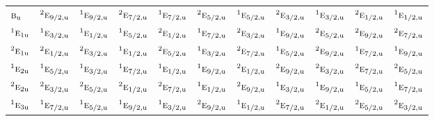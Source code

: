 \documentclass[10pt,a4paper]{article}
\numberwithin{equation}{section}
\newcommand{\irr}[1]{\text{\normalfont\scshape #1}}
\newcommand{\conjpair}[1]{{}^{#1}}
\newcommand{\ptag}[1]{\mathrm{#1}}
\begin{document}
{\begin{longtable}{@{}lcccccccccc@{}}
$\irr{b}_{\ptag{u}}$ & $\conjpair{2}\irr{e}_{9/2,\ptag{u}}$ & $\conjpair{1}\irr{e}_{9/2,\ptag{u}}$ & $\conjpair{2}\irr{e}_{7/2,\ptag{u}}$ & $\conjpair{1}\irr{e}_{7/2,\ptag{u}}$ & $\conjpair{2}\irr{e}_{5/2,\ptag{u}}$ & $\conjpair{1}\irr{e}_{5/2,\ptag{u}}$ & $\conjpair{2}\irr{e}_{3/2,\ptag{u}}$ & $\conjpair{1}\irr{e}_{3/2,\ptag{u}}$ & $\conjpair{2}\irr{e}_{1/2,\ptag{u}}$ & $\conjpair{1}\irr{e}_{1/2,\ptag{u}}$\\
$\conjpair{1}\irr{e}_{1\ptag{u}}$ & $\conjpair{1}\irr{e}_{3/2,\ptag{u}}$ & $\conjpair{1}\irr{e}_{1/2,\ptag{u}}$ & $\conjpair{1}\irr{e}_{5/2,\ptag{u}}$ & $\conjpair{2}\irr{e}_{1/2,\ptag{u}}$ & $\conjpair{1}\irr{e}_{7/2,\ptag{u}}$ & $\conjpair{2}\irr{e}_{3/2,\ptag{u}}$ & $\conjpair{1}\irr{e}_{9/2,\ptag{u}}$ & $\conjpair{2}\irr{e}_{5/2,\ptag{u}}$ & $\conjpair{2}\irr{e}_{9/2,\ptag{u}}$ & $\conjpair{2}\irr{e}_{7/2,\ptag{u}}$\\
$\conjpair{2}\irr{e}_{1\ptag{u}}$ & $\conjpair{2}\irr{e}_{1/2,\ptag{u}}$ & $\conjpair{2}\irr{e}_{3/2,\ptag{u}}$ & $\conjpair{1}\irr{e}_{1/2,\ptag{u}}$ & $\conjpair{2}\irr{e}_{5/2,\ptag{u}}$ & $\conjpair{1}\irr{e}_{3/2,\ptag{u}}$ & $\conjpair{2}\irr{e}_{7/2,\ptag{u}}$ & $\conjpair{1}\irr{e}_{5/2,\ptag{u}}$ & $\conjpair{2}\irr{e}_{9/2,\ptag{u}}$ & $\conjpair{1}\irr{e}_{7/2,\ptag{u}}$ & $\conjpair{1}\irr{e}_{9/2,\ptag{u}}$\\
$\conjpair{1}\irr{e}_{2\ptag{u}}$ & $\conjpair{1}\irr{e}_{5/2,\ptag{u}}$ & $\conjpair{1}\irr{e}_{3/2,\ptag{u}}$ & $\conjpair{1}\irr{e}_{7/2,\ptag{u}}$ & $\conjpair{1}\irr{e}_{1/2,\ptag{u}}$ & $\conjpair{1}\irr{e}_{9/2,\ptag{u}}$ & $\conjpair{2}\irr{e}_{1/2,\ptag{u}}$ & $\conjpair{2}\irr{e}_{9/2,\ptag{u}}$ & $\conjpair{2}\irr{e}_{3/2,\ptag{u}}$ & $\conjpair{2}\irr{e}_{7/2,\ptag{u}}$ & $\conjpair{2}\irr{e}_{5/2,\ptag{u}}$\\
$\conjpair{2}\irr{e}_{2\ptag{u}}$ & $\conjpair{2}\irr{e}_{3/2,\ptag{u}}$ & $\conjpair{2}\irr{e}_{5/2,\ptag{u}}$ & $\conjpair{2}\irr{e}_{1/2,\ptag{u}}$ & $\conjpair{2}\irr{e}_{7/2,\ptag{u}}$ & $\conjpair{1}\irr{e}_{1/2,\ptag{u}}$ & $\conjpair{2}\irr{e}_{9/2,\ptag{u}}$ & $\conjpair{1}\irr{e}_{3/2,\ptag{u}}$ & $\conjpair{1}\irr{e}_{9/2,\ptag{u}}$ & $\conjpair{1}\irr{e}_{5/2,\ptag{u}}$ & $\conjpair{1}\irr{e}_{7/2,\ptag{u}}$\\
$\conjpair{1}\irr{e}_{3\ptag{u}}$ & $\conjpair{1}\irr{e}_{7/2,\ptag{u}}$ & $\conjpair{1}\irr{e}_{5/2,\ptag{u}}$ & $\conjpair{1}\irr{e}_{9/2,\ptag{u}}$ & $\conjpair{1}\irr{e}_{3/2,\ptag{u}}$ & $\conjpair{2}\irr{e}_{9/2,\ptag{u}}$ & $\conjpair{1}\irr{e}_{1/2,\ptag{u}}$ & $\conjpair{2}\irr{e}_{7/2,\ptag{u}}$ & $\conjpair{2}\irr{e}_{1/2,\ptag{u}}$ & $\conjpair{2}\irr{e}_{5/2,\ptag{u}}$ & $\conjpair{2}\irr{e}_{3/2,\ptag{u}}$\\

\end{longtable}}
\end{document}

